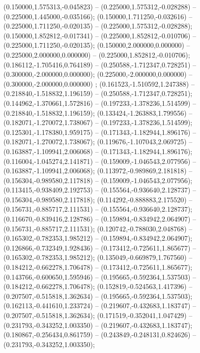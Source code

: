  (0.150000,1.575313,-0.045823) -- (0.225000,1.575312,-0.028288) -- (0.225000,1.445000,-0.035166);
 (0.150000,1.711250,-0.032616) -- (0.225000,1.711250,-0.020135) -- (0.225000,1.575312,-0.028288);
 (0.150000,1.852812,-0.017341) -- (0.225000,1.852812,-0.010706) -- (0.225000,1.711250,-0.020135);
 (0.150000,2.000000,0.000000) -- (0.225000,2.000000,0.000000) -- (0.225000,1.852812,-0.010706);
 (0.186112,-1.705416,0.764189) -- (0.250588,-1.712347,0.728251) -- (0.300000,-2.000000,0.000000);
 (0.225000,-2.000000,0.000000) -- (0.300000,-2.000000,0.000000) ;
 (0.161523,-1.510592,1.247388) -- (0.218840,-1.518832,1.196159) -- (0.250588,-1.712347,0.728251);
 (0.144962,-1.370661,1.572816) -- (0.197233,-1.378236,1.514599) -- (0.218840,-1.518832,1.196159);
 (0.133424,-1.263883,1.799556) -- (0.182071,-1.270072,1.738067) -- (0.197233,-1.378236,1.514599);
 (0.125301,-1.178380,1.959175) -- (0.171343,-1.182944,1.896176) -- (0.182071,-1.270072,1.738067);
 (0.119676,-1.107043,2.069725) -- (0.163887,-1.109941,2.006068) -- (0.171343,-1.182944,1.896176);
 (0.116004,-1.045274,2.141871) -- (0.159009,-1.046543,2.077956) -- (0.163887,-1.109941,2.006068);
 (0.113972,-0.989869,2.181818) -- (0.156304,-0.989580,2.117818) -- (0.159009,-1.046543,2.077956);
 (0.113415,-0.938409,2.192753) -- (0.155564,-0.936640,2.128737) -- (0.156304,-0.989580,2.117818);
 (0.114292,-0.888883,2.175520) -- (0.156731,-0.885717,2.111531) -- (0.155564,-0.936640,2.128737);
 (0.116670,-0.839416,2.128786) -- (0.159894,-0.834942,2.064907) -- (0.156731,-0.885717,2.111531);
 (0.120742,-0.788030,2.048768) -- (0.165302,-0.782353,1.985212) -- (0.159894,-0.834942,2.064907);
 (0.126866,-0.732349,1.928436) -- (0.173412,-0.725611,1.865677) -- (0.165302,-0.782353,1.985212);
 (0.135049,-0.669879,1.767560) -- (0.184212,-0.662278,1.706478) -- (0.173412,-0.725611,1.865677);
 (0.143766,-0.600650,1.595946) -- (0.195665,-0.592364,1.537503) -- (0.184212,-0.662278,1.706478);
 (0.152819,-0.524563,1.417396) -- (0.207507,-0.515818,1.362634) -- (0.195665,-0.592364,1.537503);
 (0.162113,-0.441610,1.233724) -- (0.219607,-0.432683,1.183747) -- (0.207507,-0.515818,1.362634);
 (0.171519,-0.352041,1.047429) -- (0.231793,-0.343252,1.003350) -- (0.219607,-0.432683,1.183747);
 (0.180867,-0.256434,0.861759) -- (0.243849,-0.248131,0.824626) -- (0.231793,-0.343252,1.003350);

